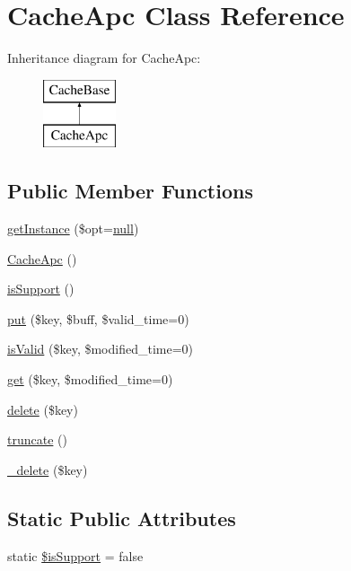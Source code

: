 \hypertarget{classCacheApc}{}\section{Cache\+Apc Class Reference}
\label{classCacheApc}
Inheritance diagram for Cache\+Apc\+:\begin{figure}[H]
\begin{center}
\leavevmode
\includegraphics[height=2.000000cm]{classCacheApc}
\end{center}
\end{figure}
\subsection*{Public Member Functions}
\begin{DoxyCompactItemize}
\item 
\hyperlink{classCacheApc_ab175f6bbdebb9ce327c019c3be313331}{get\+Instance} (\$opt=\hyperlink{modernizr_8min_8js_a286f9ec831c5e676eeb493248eab9575}{null})
\item 
\hyperlink{classCacheApc_ae75af46358f790955fce6c7fdb99ffdc}{Cache\+Apc} ()
\item 
\hyperlink{classCacheApc_abd38db973d6d7188606a726d7a5fcc40}{is\+Support} ()
\item 
\hyperlink{classCacheApc_abdfbacf78bd79a1339b0fd37d97f399e}{put} (\$key, \$buff, \$valid\+\_\+time=0)
\item 
\hyperlink{classCacheApc_ae915c4aded713867d7fab9b691ab5795}{is\+Valid} (\$key, \$modified\+\_\+time=0)
\item 
\hyperlink{classCacheApc_ae4b086e28a3b2820174641e964844ceb}{get} (\$key, \$modified\+\_\+time=0)
\item 
\hyperlink{classCacheApc_a694a318a017e38de1fa758f557dbcb80}{delete} (\$key)
\item 
\hyperlink{classCacheApc_ad32f48b59d64b4f71fc0c61744468584}{truncate} ()
\item 
\hyperlink{classCacheApc_a14d5f6b3e8743ea43ad3307816cec95d}{\+\_\+delete} (\$key)
\end{DoxyCompactItemize}
\subsection*{Static Public Attributes}
\begin{DoxyCompactItemize}
\item 
static \hyperlink{classCacheApc_a337478fa933fb622e28f28b3baee3433}{\$is\+Support} = false
\end{DoxyCompactItemize}
